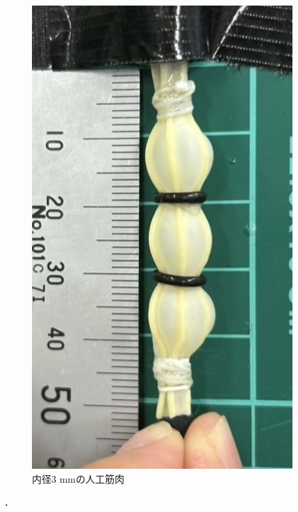 \begin{figure}[h]
\begin{minipage}{0.49\columnwidth}
    \end{minipage}
    \begin{minipage}{0.49\columnwidth}
      \vspace{4mm}
      \centering
      \includegraphics[scale=0.3]{pic/L.jpg}
      
    \end{minipage}
    \caption{内径3 mmの人工筋肉}
    \label{fig:zA}
  \end{figure}．
